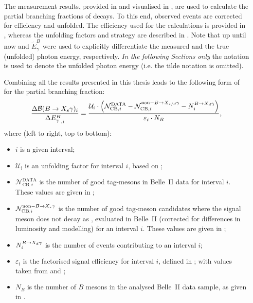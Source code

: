 The measurement results, provided in  and visualised in ,
are used to calculate the partial branching fractions of \BtoXsgamma decays.
To this end, observed \mbox{\BtoXsgamma} events are corrected for efficiency and unfolded.
The efficiency used for the calculations is provided in , 
whereas the unfolding factors and strategy are described in .
Note that up until now \EB and $\tilde{E}_{\gamma}^B$ were used to explicitly differentiate
the measured and the true (unfolded) photon energy, respectively.
\textit{In the following Sections only} the \EB notation is used to denote the unfolded photon energy (i.e. the tilde notation is omitted).

Combining all the results presented in this thesis leads to the following form of  for the partial branching fraction:
\begin{equation}\label{eq:branching_fraction}
    \frac{\Delta\mathcal{B}(\BtoXsgamma)_i}{\Delta {E^B_{\g}}_{,i}} = \frac{\mathcal{U}_i\cdot\left(\mathcal{N}^{\mathrm{DATA}}_{\mathrm{CB},i} - 
                                                                              \mathcal{N}^{\mathrm{non-}\BtoXsdgamma}_{\mathrm{CB},i} - 
                                                                              N_i^{\BtoXdgamma}\right)}
                                                         {\varepsilon_i \cdot N_B},
\end{equation}
where (left to right, top to bottom):
\begin{itemize}
    \item $i$ is a given \EB interval;
    \item $\mathcal{U}_i$ is an unfolding factor for interval $i$, based on ;
    \item $\mathcal{N}^{\mathrm{DATA}}_{\mathrm{CB},i}$ is the number of good tag-\B mesons in Belle~II data for interval $i$.
    These values are given in ;
    \item $\mathcal{N}^{\mathrm{non-}\BtoXsgamma}_{\mathrm{CB},i}$ is the number of good tag-\B meson candidates where the signal \B meson does not decay as \BtoXsdgamma, evaluated in Belle~II \MC (corrected for differences in luminosity and modelling) for an interval $i$.
    These values are given in ;
    \item $N_i^{\BtoXdgamma}$ is the number of \BtoXdgamma events contributing to an interval $i$;
    \item $\varepsilon_i$ is the factorised signal efficiency for interval $i$, defined in ; 
    with values taken from  and ;
    \item $N_B$ is the number of $B$ mesons in the analysed Belle~II data sample, as given in .
\end{itemize}

